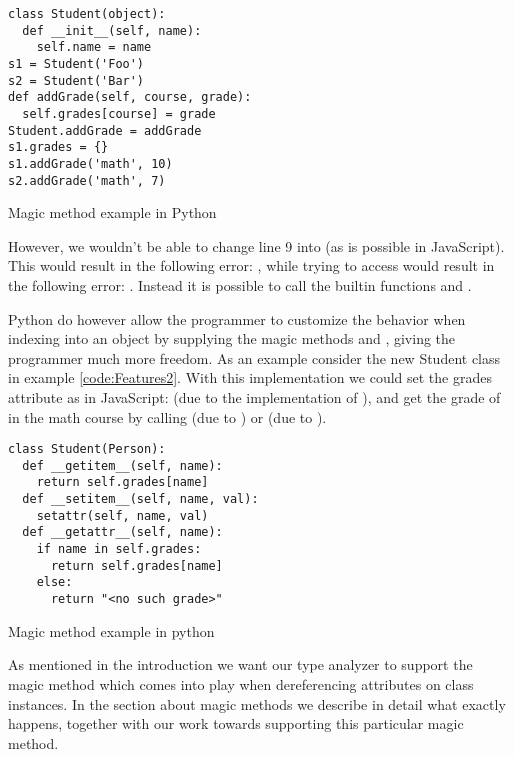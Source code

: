 \begin{listing}[H]
  \begin{verbatim}
class Student(object):
  def __init__(self, name):
    self.name = name
s1 = Student('Foo')
s2 = Student('Bar')
def addGrade(self, course, grade):
  self.grades[course] = grade
Student.addGrade = addGrade
s1.grades = {}
s1.addGrade('math', 10)
s2.addGrade('math', 7)
  \end{verbatim}
  \caption{Magic method example in Python}
  \label{code:Features1}
\end{listing}

However, we wouldn't be able to change line 9 into  (as is possible in JavaScript). This would result in the following error: 
, while trying to access  would result in the following error: 
. Instead it is possible to call the builtin functions 
 and .

Python do however allow the programmer to customize the behavior when indexing into an object by supplying the magic methods
 and , giving the programmer much more freedom. 
As an example consider the new Student class in example \ref{code:Features2}. 
With this implementation we could set the grades attribute as in JavaScript:  (due to the implementation of ), 
and get the grade of  in the math course by calling  (due to ) or  (due to ).

\begin{listing}[H]
\begin{verbatim}
class Student(Person):
  def __getitem__(self, name):
    return self.grades[name]
  def __setitem__(self, name, val):
    setattr(self, name, val)
  def __getattr__(self, name):
    if name in self.grades:
      return self.grades[name]
    else:
      return "<no such grade>"
\end{verbatim}
	\caption{Magic method example in python}
	\label{code:Features2}
\end{listing}

As mentioned in the introduction we want our type analyzer to support the magic method  which comes into play when dereferencing attributes on class instances. In the section about magic methods we describe in detail what exactly happens, together with our work towards supporting this particular magic method.